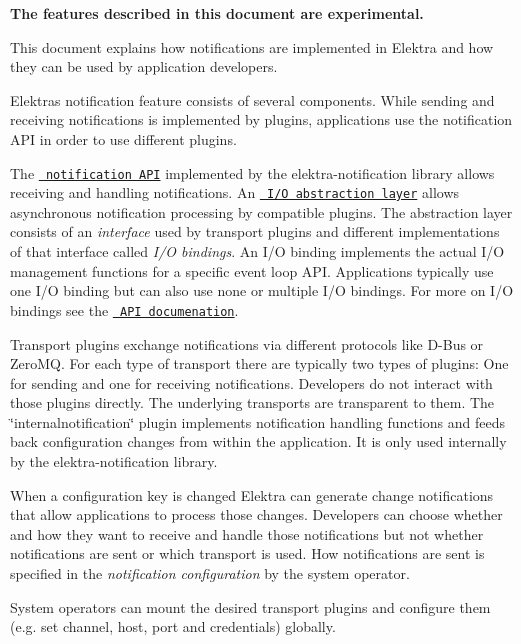 {\bfseries{The features described in this document are experimental.}}

This document explains how notifications are implemented in Elektra and how they can be used by application developers.

Elektra\textquotesingle{}s notification feature consists of several components. While sending and receiving notifications is implemented by plugins, applications use the notification A\+PI in order to use different plugins.

The \href{https://doc.libelektra.org/api/current/html/group__kdbnotification.html}{\texttt{ notification A\+PI}} implemented by the {\ttfamily elektra-\/notification} library allows receiving and handling notifications. An \href{https://doc.libelektra.org/api/current/html/group__kdbio.html}{\texttt{ I/O abstraction layer}} allows asynchronous notification processing by compatible plugins. The abstraction layer consists of an {\itshape interface} used by transport plugins and different implementations of that interface called {\itshape I/O bindings}. An I/O binding implements the actual I/O management functions for a specific event loop A\+PI. Applications typically use one I/O binding but can also use none or multiple I/O bindings. For more on I/O bindings see the \href{https://doc.libelektra.org/api/current/html/group__kdbio.html}{\texttt{ A\+PI documenation}}.

Transport plugins exchange notifications via different protocols like D-\/\+Bus or Zero\+MQ. For each type of transport there are typically two types of plugins\+: One for sending and one for receiving notifications. Developers do not interact with those plugins directly. The underlying transports are transparent to them. The \char`\"{}internalnotification\char`\"{} plugin implements notification handling functions and feeds back configuration changes from within the application. It is only used internally by the {\ttfamily elektra-\/notification} library.



When a configuration key is changed Elektra can generate change notifications that allow applications to process those changes. Developers can choose whether and how they want to receive and handle those notifications but not whether notifications are sent or which transport is used. How notifications are sent is specified in the {\itshape notification configuration} by the system operator.

System operators can mount the desired transport plugins and configure them (e.\+g. set channel, host, port and credentials) globally.


